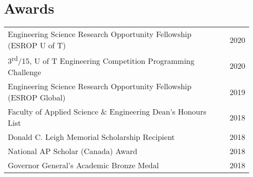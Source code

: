 \begin{minipage}[t]{0.66\textwidth}

 \section{Awards}
 \begin{tabular}{m{10.5cm}l}
  Engineering Science Research Opportunity Fellowship (ESROP U of T)             & 2020                 \\
  3\textsuperscript{rd}/15, U of T Engineering Competition Programming Challenge & 2020                 \\
  Engineering Science Research Opportunity Fellowship (ESROP Global)             & 2019                 \\
  Faculty of Applied Science \& Engineering Dean's Honours List                  & 2018\textendash 2020 \\
  Donald C. Leigh Memorial Scholarship Recipient                                 & 2018                 \\
  National AP Scholar (Canada) Award                                             & 2018                 \\
  Governor General’s Academic Bronze Medal                                       & 2018                 \\
 \end{tabular}
 \sectionspace %

\end{minipage} %
\vspace*{\fill}
